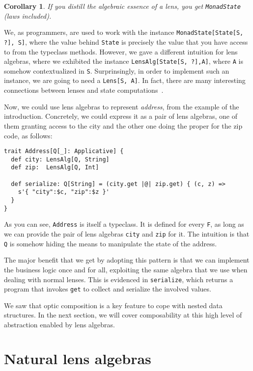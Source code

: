 \documentclass[preview, 3p]{elsarticle}
\newtheorem{corollary}{Corollary}[theorem]
\begin{document}
\begin{corollary}
If you distill the algebraic essence of a lens, you get \lstinline{MonadState}
(laws included).
\end{corollary}

We, as programmers, are used to work with the instance
\lstinline{MonadState[State[S, ?], S]}, where the value behind \lstinline{State}
is precisely the value that you have access to from the typeclass methods.
However, we gave a different intuition for lens algebras, where we exhibited the
instance \lstinline{LensAlg[State[S, ?],A]}, where \lstinline{A} is somehow
contextualized in \lstinline{S}. Surprinsingly, in order to implement such an
instance, we are going to need a \lstinline{Lens[S, A]}. In fact, there are many
interesting connections between lenses and state
computations~\cite{abou2015notions}.

Now, we could use lens algebras to represent \emph{address}, from the
example of the introduction. Concretely, we could express it as a pair of lens
algebras, one of them granting access to the city and the other one doing the
proper for the zip code, as follows: %
\begin{lstlisting}
trait Address[Q[_]: Applicative] {
  def city: LensAlg[Q, String]
  def zip:  LensAlg[Q, Int]

  def serialize: Q[String] = (city.get |@| zip.get) { (c, z) =>
    s'{ "city":$c, "zip":$z }'
  }
}
\end{lstlisting}
As you can see, \lstinline{Address} is itself a typeclass. It is defined for
every \lstinline{F}, as long as we can provide the pair of lens algebras
\lstinline{city} and \lstinline{zip} for it. The intuition is that \lstinline{Q}
is somehow hiding the means to manipulate the state of the address.

The major benefit that we get by adopting this pattern is that we can implement
the business logic once and for all, exploiting the same algebra that we use
when dealing with normal lenses. This is evidenced in \lstinline{serialize},
which returns a program that invokes \lstinline{get} to collect and serialize
the involved values.

We saw that optic composition is a key feature to cope with nested data
structures. In the next section, we will cover composability at this high level
of abstraction enabled by lens algebras.

\section{Natural lens algebras}
\label{sec:Natural}
\end{document}
